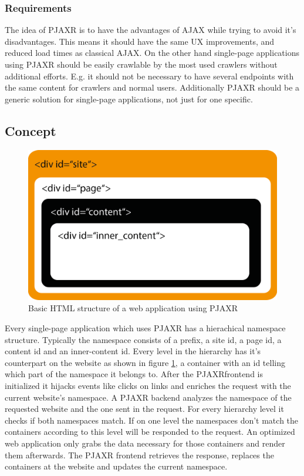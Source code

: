 \documentclass[f,bachelor,binding,twoside,palatino]{WeSTthesis}
\def \ajax {AJAX}
\def \pjaxr {PJAXR}
\def \singlePageApplication {single-page application}
\begin{document}
\subsubsection{Requirements}
The idea of \pjaxr{} is to have the advantages of \ajax{} while trying to avoid it's disadvantages.
This means it should have the same UX improvements, and reduced load times as classical \ajax{}.
On the other hand \singlePageApplication{}s using \pjaxr{} should be easily crawlable by the most used crawlers without additional efforts.
E.g. it should not be necessary to have several endpoints with the same content for crawlers and normal users.
Additionally \pjaxr{} should be a generic solution for \singlePageApplication{}s, not just for one specific.

\subsection{Concept}

\begin{figure}[H]
\centering
\includegraphics[width=13cm]{images/pjaxr_html.png}
\caption[pjaxr_html]{Basic HTML structure of a web application using \pjaxr{}}
\label{fig:pjaxr_html}
\end{figure}

Every \singlePageApplication{} which uses \pjaxr{} has a hierachical namespace structure.
Typically the namespace consists of a prefix, a site id, a page id, a content id and an inner-content id.
Every level in the hierarchy has it's counterpart on the website as shown in figure \ref{fig:pjaxr_html}, a container with an id telling which part of the namespace it belongs to.
After the \pjaxr frontend is initialized it hijacks events like clicks on links and enriches the request with the current website's namespace.
A \pjaxr{} backend analyzes the namespace of the requested website and the one sent in the request.
For every hierarchy level it checks if both namespaces match.
If on one level the namespaces don't match the containers according to this level will be responded to the request.
An optimized web application only grabs the data necessary for those containers and render them afterwards.
The \pjaxr{} frontend retrieves the response, replaces the containers at the website and updates the current namespace.
\end{document}
